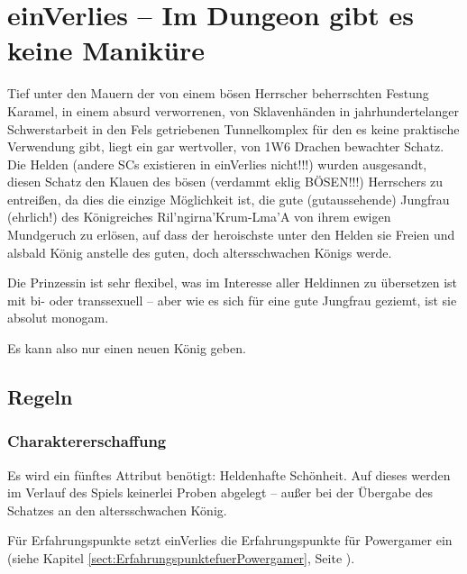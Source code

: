 
\section{einVerlies -- Im Dungeon gibt es keine Maniküre}
\label{sect:einVerlies}
Tief unter den Mauern der von einem bösen Herrscher beherrschten Festung Karamel, in einem absurd verworrenen, von Sklavenhänden in jahrhundertelanger Schwerstarbeit in den Fels getriebenen Tunnelkomplex für den es keine praktische Verwendung gibt, liegt ein gar wertvoller, von 1W6 Drachen bewachter Schatz. Die Helden (andere SCs existieren in einVerlies nicht!!!) wurden ausgesandt, diesen Schatz den Klauen des bösen (verdammt eklig BÖSEN!!!) Herrschers zu entreißen, da dies die einzige Möglichkeit ist, die gute (gutaussehende) Jungfrau (ehrlich!) des Königreiches Ril'ngirna'Krum-Lma'A von ihrem ewigen Mundgeruch zu erlösen, auf dass der heroischste unter den Helden sie Freien und alsbald König anstelle des guten, doch altersschwachen Königs werde.

Die Prinzessin ist sehr flexibel, was im Interesse aller Heldinnen zu übersetzen ist mit bi- oder transsexuell -- aber wie es sich für eine gute Jungfrau geziemt, ist sie absolut monogam.

Es kann also nur einen neuen König geben.

 

\subsection{Regeln}

\subsubsection{Charaktererschaffung}


Es wird ein fünftes Attribut benötigt: Heldenhafte Schönheit. Auf dieses werden im Verlauf des Spiels keinerlei Proben abgelegt -- außer bei der Übergabe des Schatzes an den altersschwachen König.

Für Erfahrungspunkte setzt einVerlies die Erfahrungspunkte für Powergamer ein (siehe Kapitel \ref {sect:ErfahrungspunktefuerPowergamer}, Seite \pageref {sect:ErfahrungspunktefuerPowergamer}).



